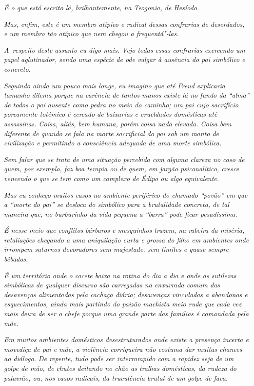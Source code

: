 \emph{É o que está escrito lá, brilhantemente, na Teogonia, de
Hesíodo.}

\emph{Mas, enfim, este  é um membro atípico e radical dessas
confrarias de deserdados, e um membro tão atípico que nem chegou a
frequentá"-las.}

\emph{A~respeito deste assunto eu digo mais. Vejo todas essas confrarias
exercendo um papel aglutinador, sendo uma espécie de ode vulgar à
ausência do pai simbólico e concreto.}

\emph{Seguindo ainda um pouco mais longe, eu imagino que até Freud
explicaria tamanho dilema porque na carência de tantos manos existe lá
no fundo da ``alma'' de todos o pai ausente como pedra no meio do
caminho; um pai cujo sacrifício porcamente totêmico é cercado de
baixarias e crueldades domésticas até assassinas. Coisa, aliás, bem
humana, porém coisa nada elevada. Coisa bem diferente de quando se fala
na morte sacrificial do pai sob um manto de civilização e permitindo a
consciência adequada de uma morte simbólica.}

\emph{Sem falar que se trata de uma situação percebida com alguma
clareza no caso de quem, por exemplo, faz boa terapia ou de quem, em
jargão psicanalítico, cresce vencendo o que se tem como um complexo de
Édipo ou algo equivalente.}

\emph{Mas eu conheço muitos casos no ambiente periférico do chamado
``povão'' em que a ``morte do pai'' se desloca do simbólico para a
brutalidade concreta, de tal maneira que, no burburinho da vida pequena
a ``barra'' pode ficar pesadíssima.}

\emph{É nesse meio que conflitos bárbaros e mesquinhos trazem, na
rabeira da miséria, retaliações chegando a uma aniquilação curta e
grossa do filho em ambientes onde irrompem saturnos devoradores sem
majestade, sem limites e quase sempre bêbados.}

\emph{É um território onde o cacete baixa na rotina do dia a dia e onde
as sutilezas simbólicas de qualquer discurso são carregadas na enxurrada
comum das desavenças alimentadas pela cachaça diária; desavenças
vinculadas a abandonos e esquecimentos, ainda mais partindo do paizão
machista meio rude que cada vez mais deixa de ser o chefe porque uma
grande parte das famílias é comandada pela mãe.}

\emph{Em muitos ambientes domésticos desestruturados onde existe a
presença incerta e movediça de pai e mãe, a violência corriqueira não
costuma dar muitas chances ao diálogo. De repente, tudo pode ser
interrompido com a rapidez seja de um golpe de mão, de chutes deitando
no chão as tralhas domésticas, da rudeza do palavrão, ou, nos casos
radicais, da truculência brutal de um golpe de faca.}

